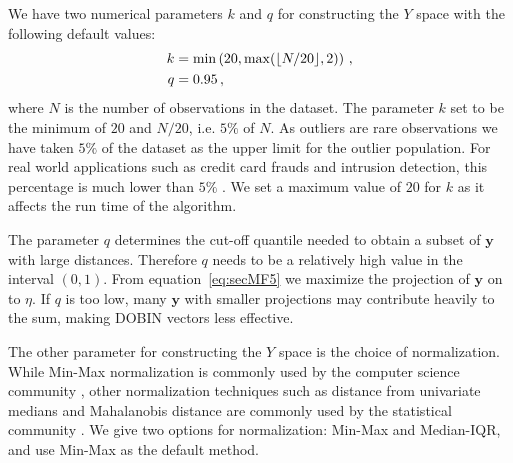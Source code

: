 \documentclass[letter,12pt]{article}
\begin{document}
We have {\color{blue} two} numerical parameters {\color{blue} $k$ } and $q$ for constructing the $Y$ space with the following default values:
\begin{align} \label{eq:secMF15}
	k & = \min\left(20, \max (\lfloor N/20 \rfloor ,2) \right) \notag \, , \\
	q   & = 0.95 \notag \, ,
\end{align}
where $N$ is the number of observations in the dataset. {\color{blue} The parameter $k$ set to be the minimum of $20$ and $N/20$, i.e.  $5\%$ of $N$. As outliers are rare observations we have taken $5\%$ of the dataset as the upper limit for the outlier population. For real world applications such as credit card frauds and intrusion detection, this percentage is much lower than $5\%$ \citep{goldstein2016comparative, kaggle_dat_cc_fraud}.}  We set a maximum value of $20$ for $k$ as it affects the run time of the algorithm. %

The parameter $q$ determines the cut-off quantile needed to obtain a subset of $\bm{y}$ with large distances. Therefore $q$ needs to be a relatively high value in the interval $(0,1)$. From equation~\eqref{eq:secMF5} we maximize the projection of $\bm{y}$ on to $\eta$. If $q$ is too low, many $\bm{y}$ with smaller projections may contribute heavily to the sum, making DOBIN vectors less effective.

The other parameter for constructing the $Y$ space is the choice of normalization. While Min-Max normalization is commonly used by the computer science community \citep{campos2016evaluation}, other normalization techniques such as distance from univariate medians and Mahalanobis distance are commonly used by the statistical community \citep{billor2000bacon}. We give two options for normalization: Min-Max and Median-IQR,  { \color{blue} and use  Min-Max as the default method. }

\end{document}
